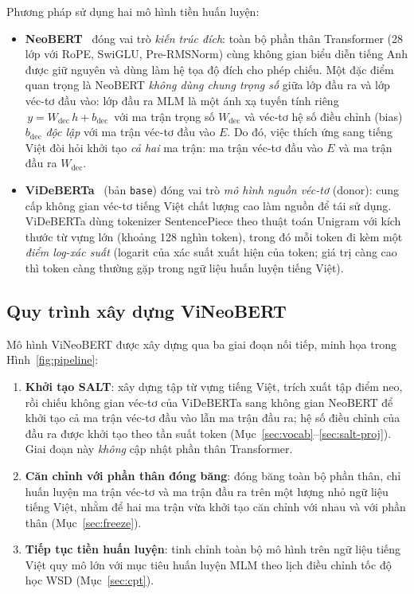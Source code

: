 Phương pháp sử dụng hai mô hình tiền huấn luyện:
\begin{itemize}
  \item \textbf{NeoBERT}~\cite{lebreton2025neobert} đóng vai trò \textit{kiến trúc đích}:
        toàn bộ phần thân Transformer (28 lớp với RoPE, SwiGLU, Pre-RMSNorm) cùng không gian
        biểu diễn tiếng Anh được giữ nguyên và dùng làm hệ tọa độ đích cho phép chiếu. Một
        đặc điểm quan trọng là NeoBERT \textit{không dùng chung trọng số} giữa lớp đầu ra và lớp véc-tơ đầu vào:
        lớp đầu ra MLM là một ánh xạ tuyến tính riêng $\,y = W_{\mathrm{dec}}\,h
        + b_{\mathrm{dec}}\,$ với ma trận trọng số $W_{\mathrm{dec}}$ và véc-tơ hệ số điều chỉnh (bias)
        $b_{\mathrm{dec}}$ \textit{độc lập} với ma trận véc-tơ đầu vào $E$. Do đó, việc thích
        ứng sang tiếng Việt đòi hỏi khởi tạo \textit{cả hai} ma trận: ma trận véc-tơ
        đầu vào $E$ và ma trận đầu ra $W_{\mathrm{dec}}$.
  \item \textbf{ViDeBERTa}~\cite{lai2023videberta} (bản \texttt{base}) đóng vai trò
        \textit{mô hình nguồn véc-tơ} (donor): cung cấp không gian véc-tơ tiếng Việt chất lượng
        cao làm nguồn để tái sử dụng. ViDeBERTa dùng tokenizer SentencePiece theo thuật
        toán Unigram với kích thước từ vựng lớn (khoảng 128 nghìn token), trong đó mỗi token
        đi kèm một \textit{điểm log-xác suất} (logarit của xác suất xuất hiện của token; giá
        trị càng cao thì token càng thường gặp trong ngữ liệu huấn luyện tiếng Việt).
\end{itemize}

\subsection{Quy trình xây dựng ViNeoBERT}
\label{subsec:pipeline}

Mô hình ViNeoBERT được xây dựng qua ba giai đoạn nối tiếp, minh họa trong
Hình~\ref{fig:pipeline}:
\begin{enumerate}
  \item \textbf{Khởi tạo SALT}: xây dựng tập từ vựng tiếng Việt, trích xuất tập điểm neo, rồi
        chiếu không gian véc-tơ của ViDeBERTa sang không gian NeoBERT để khởi tạo cả ma trận
        véc-tơ đầu vào lẫn ma trận đầu ra; hệ số điều chỉnh của đầu ra được khởi tạo theo tần suất token
        (Mục~\ref{sec:vocab}--\ref{sec:salt-proj}). Giai đoạn này \textit{không} cập
        nhật phần thân Transformer.
  \item \textbf{Căn chỉnh với phần thân đóng băng}: đóng băng toàn bộ phần thân, chỉ huấn luyện ma trận
        véc-tơ và ma trận đầu ra trên một lượng nhỏ ngữ liệu tiếng Việt, nhằm để hai ma trận
        vừa khởi tạo căn chỉnh với nhau và với phần thân (Mục~\ref{sec:freeze}).
  \item \textbf{Tiếp tục tiền huấn luyện}: tinh chỉnh toàn bộ mô hình trên ngữ
        liệu tiếng Việt quy mô lớn với mục tiêu huấn luyện MLM theo lịch điều chỉnh tốc độ học WSD
        (Mục~\ref{sec:cpt}).
\end{enumerate}

